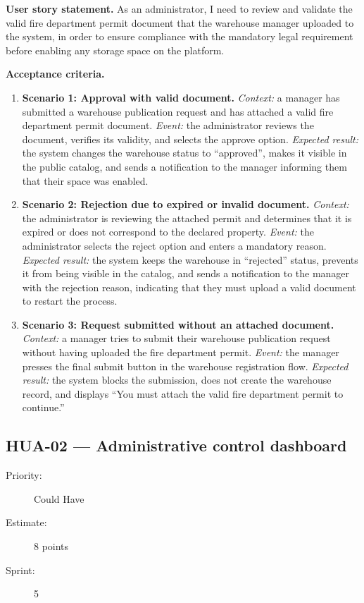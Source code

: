 \documentclass[11pt,a4paper,oneside]{report}
\begin{document}
\textbf{User story statement.} As an administrator, I need to review and validate the valid fire department permit document that the warehouse manager uploaded to the system, in order to ensure compliance with the mandatory legal requirement before enabling any storage space on the platform.

\textbf{Acceptance criteria.}
\begin{enumerate}
\item \textbf{Scenario 1: Approval with valid document.} \emph{Context:} a manager has submitted a warehouse publication request and has attached a valid fire department permit document. \emph{Event:} the administrator reviews the document, verifies its validity, and selects the approve option. \emph{Expected result:} the system changes the warehouse status to ``approved'', makes it visible in the public catalog, and sends a notification to the manager informing them that their space was enabled.
\item \textbf{Scenario 2: Rejection due to expired or invalid document.} \emph{Context:} the administrator is reviewing the attached permit and determines that it is expired or does not correspond to the declared property. \emph{Event:} the administrator selects the reject option and enters a mandatory reason. \emph{Expected result:} the system keeps the warehouse in ``rejected'' status, prevents it from being visible in the catalog, and sends a notification to the manager with the rejection reason, indicating that they must upload a valid document to restart the process.
\item \textbf{Scenario 3: Request submitted without an attached document.} \emph{Context:} a manager tries to submit their warehouse publication request without having uploaded the fire department permit. \emph{Event:} the manager presses the final submit button in the warehouse registration flow. \emph{Expected result:} the system blocks the submission, does not create the warehouse record, and displays ``You must attach the valid fire department permit to continue.''
\end{enumerate}

\subsection{HUA-02 --- Administrative control dashboard}
\label{req:HUA-02}
\begin{description}
\item[Priority:] Could Have \quad \item[Estimate:] 8 points \quad \item[Sprint:] 5
\end{description}
\end{document}
